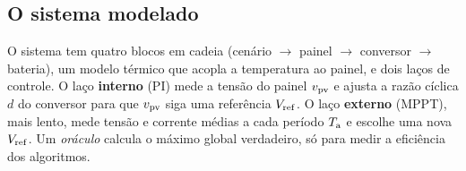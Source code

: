 \subsection{O sistema modelado}\label{sec:diagrama_sistema}

O sistema tem quatro blocos em cadeia (cen\'ario $\to$ painel $\to$ conversor $\to$ bateria), um
modelo t\'ermico que acopla a temperatura ao painel, e dois la\c{c}os de controle. O la\c{c}o
\textbf{interno} (PI) mede a tens\~ao do painel $v_{\mathrm{pv}}$ e ajusta a raz\~ao c\'iclica $d$ do conversor
para que $v_{\mathrm{pv}}$ siga uma refer\^encia $V_{\mathrm{ref}}$. O la\c{c}o \textbf{externo} (MPPT), mais lento, mede
tens\~ao e corrente m\'edias a cada per\'iodo $T_{\mathrm{a}}$ e escolhe uma nova $V_{\mathrm{ref}}$. Um \emph{or\'aculo}
calcula o m\'aximo global verdadeiro, s\'o para medir a efici\^encia dos algoritmos.

